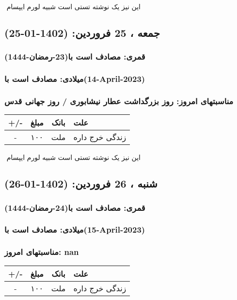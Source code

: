 \documentclass{article}
\newcommand{\rnote}[1]{\marginpar{\textcolor{color}{\StrSubstitute{\##1}{ }{\_}}}}
\newcommand{\myRow}[4]{
    #1 & #2 & #3 & #4 \\ \hline
}
\begin{document}
‌
\rnote{تست}
این نیز یک نوشته تستی است شبیه لورم ایپسام




\newpage
{}
\textcolor{color}{
\section{ جمعه ، 25 فروردین: (1402-01-25) }
\subsubsection*{قمری: مصادف است با(23-رمضان-1444)} 
\subsubsection*{میلادی: مصادف است با(14-April-2023)}
\subsubsection*{مناسبتهای امروز: روز بزرگداشت عطار نیشابوری / روز جهانی قدس}
}


\begin{tabular}{ | c | c | c | p{5cm} |}
    \hline
    \myRow{ +/- }{مبلغ}{بانک}{علت}
    \myRow{-}{۱۰۰}{ملت}{زندگی خرج داره}
\end{tabular}
\newline
\newline

‌
\rnote{تست}
این نیز یک نوشته تستی است شبیه لورم ایپسام




\newpage
{}
\textcolor{color}{
\section{ شنبه ، 26 فروردین: (1402-01-26) }
\subsubsection*{قمری: مصادف است با(24-رمضان-1444)} 
\subsubsection*{میلادی: مصادف است با(15-April-2023)}
\subsubsection*{مناسبتهای امروز: nan}
}


\begin{tabular}{ | c | c | c | p{5cm} |}
    \hline
    \myRow{ +/- }{مبلغ}{بانک}{علت}
    \myRow{-}{۱۰۰}{ملت}{زندگی خرج داره}
\end{tabular}
\newline
\newline
\end{document}
